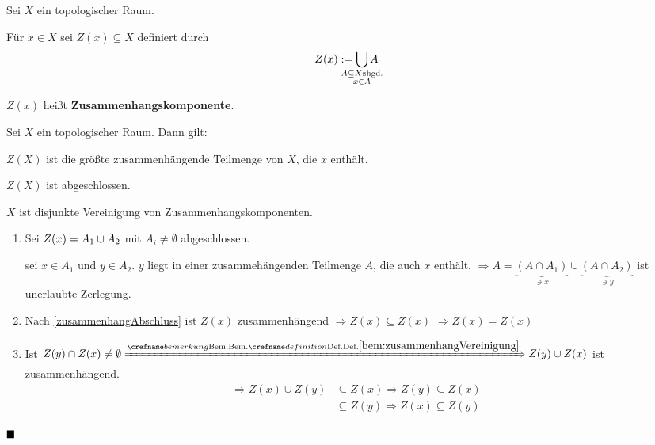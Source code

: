 \begin{definition}%
    Sei $X$ ein topologischer Raum.
    
    Für $x \in X$ sei $Z(x) \subseteq X$ definiert durch
    \[Z(x) := \bigcup_{\mathclap{\substack{A \subseteq X \text{zhgd.}\\ x \in A}}} A\]

     $Z(x)$ heißt \textbf{Zusammenhangskomponente}.
\end{definition}

\begin{bemerkung}
    Sei $X$ ein topologischer Raum. Dann gilt:
    \begin{bemenum}
        \item $Z(X)$ ist die größte zusammenhängende Teilmenge von $X$,
              die $x$ enthält.
        \item $Z(X)$ ist abgeschlossen.
        \item $X$ ist disjunkte Vereinigung von Zusammenhangskomponenten.
    \end{bemenum}
\end{bemerkung}

\begin{beweis}\leavevmode
    \begin{enumerate}[label=\alph*)]
        \item Sei $Z(x) = A_1 \mathbin{\dot{\cup}} A_2$ mit $A_i \neq \emptyset$ abgeschlossen.

            \Obda sei $x \in A_1$ und $y \in A_2$. $y$ liegt in einer zusammehängenden
            Teilmenge $A$, die auch $x$ enthält.
            $\Rightarrow A = \underbrace{(A \cap A_1)}_{\ni x} \cup \underbrace{(A \cap A_2)}_{\ni y}$
            ist unerlaubte Zerlegung.
        \item Nach \cref{zusammenhangAbschluss} ist $\overline{Z(x)}$
              zusammenhängend $\Rightarrow \overline{Z(x)} \subseteq Z(x)$
              $\Rightarrow Z(x) = \overline{Z(x)}$
        \item Ist $Z(y) \cap Z(x) \neq \emptyset \xRightarrow{\crefabbr{bem:zusammenhangVereinigung}} Z(y) \cup Z(x)$
              ist zusammenhängend. \\
              \begin{align*}
                \Rightarrow Z(x) \cup Z(y) &\subseteq Z(x) \Rightarrow Z(y) \subseteq Z(x)\\
                                           &\subseteq Z(y) \Rightarrow Z(x) \subseteq Z(y)
              \end{align*} 
    \end{enumerate}

    $\qed$
\end{beweis}

